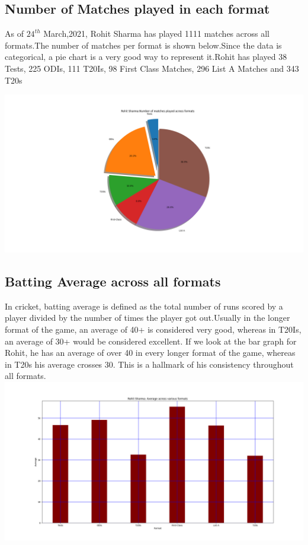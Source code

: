 \documentclass[twoside,10pt,a4paper]{article}
\numberwithin{equation}{section}
\numberwithin{figure}{section}
\begin{document}
\subsection{Number of Matches played in each format}
As of $24^{th}$ March,2021, Rohit Sharma has played 1111 matches across all formats.The number of matches per format is shown below.Since the data is categorical, a pie chart is a very good way to represent it.Rohit has played 38 Tests, 225 ODIs, 111 T20Is, 98 First Class Matches, 296 List A Matches and 343 T20s
\begin{flushleft}
    \includegraphics[scale=0.30]{matches.png}
\end{flushleft}
\subsection{Batting Average across all formats}
In cricket, batting average is defined as the total number of runs scored by a player divided by the number of times the player got out.Usually in the longer format of the game, an average of 40+ is considered very good, whereas in T20Is, an average of 30+ would be considered excellent. If we look at the bar graph for Rohit, he has an average of over 40 in every longer format of the game, whereas in T20s his average crosses 30. This is a hallmark of his consistency throughout all formats.
    \includegraphics[scale=0.23]{Average.png}
\end{document}
